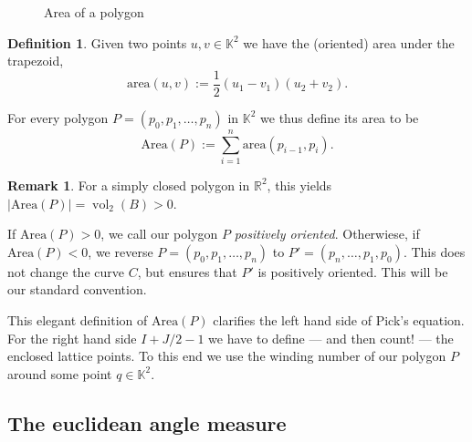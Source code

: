 \documentclass[a4paper]{amsart}
\numberwithin{equation}{section}
\theoremstyle{plain}
\theoremstyle{definition}
\newtheorem{definition}[theorem]{Definition}
\newtheorem{remark}[theorem]{Remark}
\newcommand{\R}{\mathbb{R}}
\newcommand{\K}{\mathbb{K}}
\newcommand{\abs}[1]{\lvert #1 \rvert}
\DeclareMathOperator{\vol}{vol}
\newcommand{\area}{\mathrm{area}}
\newcommand{\Area}{\mathrm{Area}}
\begin{document}
\begin{figure}[ht]
  \caption{Area of a polygon}
\end{figure}

\begin{definition}
  Given two points $u,v \in \K^2$ we have the (oriented) area under the trapezoid,
  \[
  \area(u,v) := \frac{1}{2} (u_1 - v_1) (u_2 + v_2) .
  \]
  
  For every polygon $P = (p_0,p_1,\ldots,p_n)$ in $\K^2$
  we thus define its area to be 
  \[
  \Area(P) := \sum_{i=1}^{n} \area(p_{i-1},p_i) .
  \]
\end{definition}

\begin{remark}
  For a simply closed polygon in $\R^2$, this yields $\abs{\Area(P)} = \vol_2(B) > 0$.

  If $\Area(P) > 0$, we call our polygon $P$ \emph{positively oriented}.
  Otherwiese, if $\Area(P) < 0$, we reverse $P = (p_0,p_1,\ldots,p_n)$
  to $P' = (p_n,\ldots,p_1,p_0)$.  This does not change the curve $C$,
  but ensures that $P'$ is positively oriented.
  This will be our standard convention.
\end{remark}

This elegant definition of $\Area(P)$ clarifies
the left hand side of Pick's equation.
For the right hand side $I + J/2 - 1$
we have to define --- and then count! ---
the enclosed lattice points.
To this end we use the winding number
of our polygon $P$ around some point $q \in \K^2$.


\subsection{The euclidean angle measure}
\end{document}
